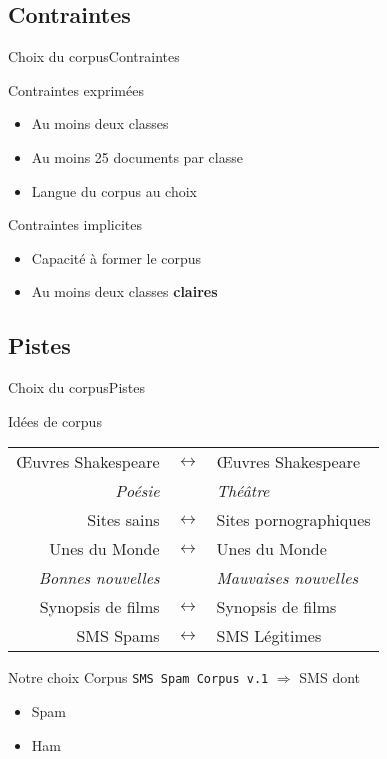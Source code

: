 \subsection{Contraintes}
\begin{frame}{Choix du corpus}{Contraintes}
\begin{block}{Contraintes exprimées}
	\begin{itemize}
	\item Au moins deux classes
	\item Au moins 25 documents par classe
	\item Langue du corpus au choix
	\end{itemize}
\end{block}
\begin{block}{Contraintes implicites}
	\begin{itemize}
	\item Capacité à former le corpus
	\item Au moins deux classes \textbf{claires}
	\end{itemize}
\end{block}
\end{frame}

\subsection{Pistes}
\begin{frame}{Choix du corpus}{Pistes}
\begin{block}{Idées de corpus}
\begin{center}
	\begin{tabular}{|r c l|}
	\hline
	Œuvres Shakespeare & $\leftrightarrow$ & Œuvres Shakespeare \\
	\textit{Poésie} & & \textit{Théâtre} \\
	\hline
	Sites sains & $\leftrightarrow$ & Sites pornographiques \\
	\hline
	Unes du Monde & $\leftrightarrow$ & Unes du Monde \\
	\textit{Bonnes nouvelles} & & \textit{Mauvaises nouvelles} \\
	\hline
	Synopsis de films & $\leftrightarrow$ & Synopsis de films \\	
	\hline
	SMS Spams & $\leftrightarrow$ & SMS Légitimes \\	
	\hline
	\end{tabular}
\end{center}
\end{block}
\pause
\begin{block}{Notre choix}
Corpus \texttt{SMS Spam Corpus v.1} $\Rightarrow$  SMS dont
		\begin{itemize}
			\item {} Spam
			\item {} Ham
		\end{itemize}
\end{block}
\end{frame}


